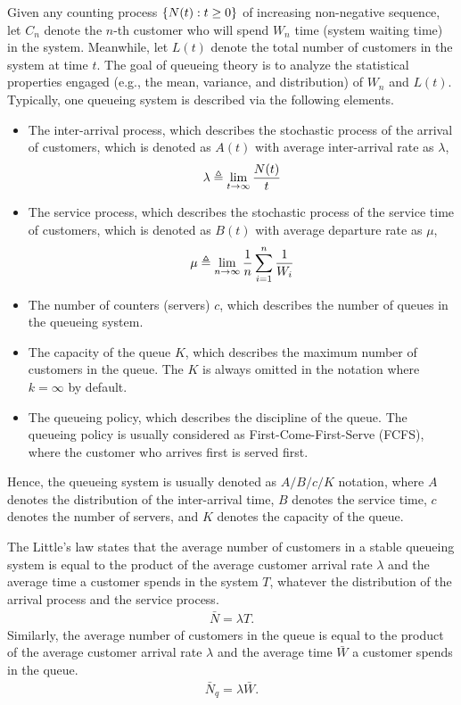 Given any counting process $\{N(t): t \geq 0\}$ of increasing non-negative sequence, let $C_n$ denote the $n$-th customer who will spend $W_n$ time (system waiting time) in the system.
Meanwhile, let $L(t)$ denote the total number of customers in the system at time $t$.
The goal of queueing theory is to analyze the statistical properties engaged (e.g., the mean, variance, and distribution) of $W_n$ and $L(t)$.
Typically, one queueing system is described via the following elements.
\begin{itemize}
    \item The inter-arrival process, which describes the stochastic process of the arrival of customers, which is denoted as $A(t)$ with average inter-arrival rate as $\lambda$,
    $$
    \lambda \triangleq \lim_{t\to\infty} \frac{N(t)}{t}
    $$
    \item The service process, which describes the stochastic process of the service time of customers, which is denoted as $B(t)$ with average departure rate as $\mu$,
    $$
    \mu \triangleq \lim_{n\to\infty} \frac{1}{n} \sum_{i=1}^{n} \frac{1}{W_i}
    $$
    \item The number of counters (servers) $c$, which describes the number of queues in the queueing system.
    \item The capacity of the queue $K$, which describes the maximum number of customers in the queue. The $K$ is always omitted in the notation where $k=\infty$ by default.
    \item The queueing policy, which describes the discipline of the queue. The queueing policy is usually considered as First-Come-First-Serve (FCFS), where the customer who arrives first is served first.
\end{itemize}
Hence, the queueing system is usually denoted as $A/B/c/K$ notation, where $A$ denotes the distribution of the inter-arrival time, $B$ denotes the service time, $c$ denotes the number of servers, and $K$ denotes the capacity of the queue.

The Little's law states that the average number of customers in a stable queueing system is equal to the product of the average customer arrival rate $\lambda$ and the average time a customer spends in the system $T$, whatever the distribution of the arrival process and the service process.
\begin{align*}
    \bar{N} = \lambda T.
\end{align*}
Similarly, the average number of customers in the queue is equal to the product of the average customer arrival rate $\lambda$ and the average time $\bar{W}$ a customer spends in the queue.
\begin{align*}
    \bar{N}_q = \lambda \bar{W}.
\end{align*}

